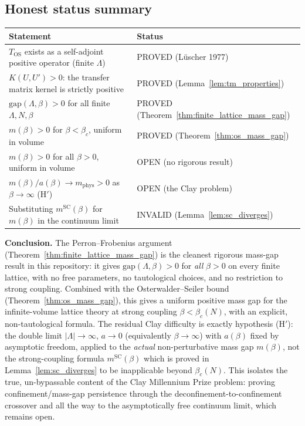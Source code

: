 \subsection{Honest status summary}
\label{ssec:pf_summary}

\begin{center}
\begin{tabular}{p{8cm}|l}
\hline
\textbf{Statement} & \textbf{Status}\\
\hline
$T_{\mathrm{OS}}$ exists as a self-adjoint positive operator (finite $\Lambda$)
  & PROVED (L\"uscher 1977)\\
$K(U,U')>0$: the transfer matrix kernel is strictly positive
  & PROVED (Lemma~\ref{lem:tm_properties})\\
$\mathrm{gap}(\Lambda,\beta)>0$ for all finite $\Lambda, N, \beta$
  & PROVED (Theorem~\ref{thm:finite_lattice_mass_gap})\\
$m(\beta)>0$ for $\beta<\beta_{c}$, uniform in volume
  & PROVED (Theorem~\ref{thm:os_mass_gap})\\
$m(\beta)>0$ for all $\beta>0$, uniform in volume
  & OPEN (no rigorous result)\\
$m(\beta)/a(\beta)\to m_{\mathrm{phys}}>0$ as $\beta\to\infty$ (H$'$)
  & OPEN (the Clay problem)\\
Substituting $m^{\mathrm{SC}}(\beta)$ for $m(\beta)$ in the continuum limit
  & INVALID (Lemma~\ref{lem:sc_diverges})\\
\hline
\end{tabular}
\end{center}

\medskip

\textbf{Conclusion.} The Perron--Frobenius argument
(Theorem~\ref{thm:finite_lattice_mass_gap}) is the cleanest rigorous mass-gap
result in this repository: it gives $\mathrm{gap}(\Lambda,\beta)>0$ for
\emph{all} $\beta>0$ on every finite lattice, with no free parameters, no
tautological choices, and no restriction to strong coupling. Combined with
the Osterwalder--Seiler bound (Theorem~\ref{thm:os_mass_gap}), this gives a
uniform positive mass gap for the infinite-volume lattice theory at strong
coupling $\beta<\beta_{c}(N)$, with an explicit, non-tautological formula.
The residual Clay difficulty is exactly hypothesis (H$'$): the double limit
$|\Lambda|\to\infty$, $a\to 0$ (equivalently $\beta\to\infty$) with $a(\beta)$
fixed by asymptotic freedom, applied to the \emph{actual} non-perturbative
mass gap $m(\beta)$, not the strong-coupling formula
$m^{\mathrm{SC}}(\beta)$ which is proved in Lemma~\ref{lem:sc_diverges} to be
inapplicable beyond $\beta_{c}(N)$. This isolates the true, un-bypassable
content of the Clay Millennium Prize problem: proving confinement/mass-gap
persistence through the deconfinement-to-confinement crossover and all the
way to the asymptotically free continuum limit, which remains open.

\endinput
